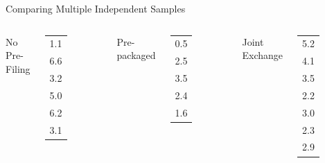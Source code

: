 \begin{frame}{Comparing Multiple Independent Samples}


  \begin{columns}[t]

      No Pre-Filing \\
      \begin{tabular}{l}
        1.1 \\ 6.6  \\ 3.2 \\ 5.0  \\ 6.2 \\ 3.1
      \end{tabular}



      Pre-packaged \\
      \begin{tabular}{l}
        0.5 \\ 2.5 \\ 3.5 \\ 2.4 \\ 1.6
      \end{tabular}



      Joint Exchange \\
      \begin{tabular}{l}
        5.2 \\ 4.1 \\ 3.5 \\ 2.2 \\ 3.0 \\ 2.3 \\ 2.9
      \end{tabular}


  \end{columns}



\end{frame}


